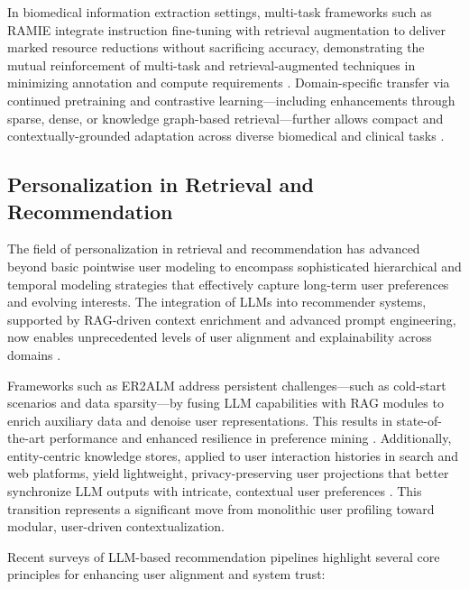 \documentclass[sigconf]{acmart}
\begin{document}
In biomedical information extraction settings, multi-task frameworks such as RAMIE integrate instruction fine-tuning with retrieval augmentation to deliver marked resource reductions without sacrificing accuracy, demonstrating the mutual reinforcement of multi-task and retrieval-augmented techniques in minimizing annotation and compute requirements \cite{ref32}. Domain-specific transfer via continued pretraining and contrastive learning—including enhancements through sparse, dense, or knowledge graph-based retrieval—further allows compact and contextually-grounded adaptation across diverse biomedical and clinical tasks \cite{ref33, ref55}.

\subsection{Personalization in Retrieval and Recommendation}

The field of personalization in retrieval and recommendation has advanced beyond basic pointwise user modeling to encompass sophisticated hierarchical and temporal modeling strategies that effectively capture long-term user preferences and evolving interests. The integration of LLMs into recommender systems, supported by RAG-driven context enrichment and advanced prompt engineering, now enables unprecedented levels of user alignment and explainability across domains \cite{ref3, ref4, ref5, ref11, ref13, ref19, ref21, ref23, ref24, ref30, ref32, ref33, ref34, ref36, ref39, ref52, ref55, ref61}.

Frameworks such as ER2ALM address persistent challenges—such as cold-start scenarios and data sparsity—by fusing LLM capabilities with RAG modules to enrich auxiliary data and denoise user representations. This results in state-of-the-art performance and enhanced resilience in preference mining \cite{ref36}. Additionally, entity-centric knowledge stores, applied to user interaction histories in search and web platforms, yield lightweight, privacy-preserving user projections that better synchronize LLM outputs with intricate, contextual user preferences \cite{ref39}. This transition represents a significant move from monolithic user profiling toward modular, user-driven contextualization.

Recent surveys of LLM-based recommendation pipelines highlight several core principles for enhancing user alignment and system trust:
\end{document}
